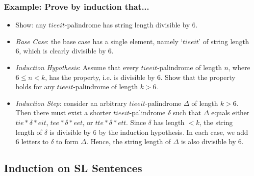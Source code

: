 \begin{frame}
\frametitle{Example: Prove by induction that...}

\begin{itemize}[<+->]

\item Show: any $tieeit$-palindrome has string length divisible by 6. 

\item[] \emph{Base Case}: the base case has a single element, namely `$tieeit$' of string length 6, which is clearly divisible by 6. 

\item[] \emph{Induction Hypothesis}: Assume that every $tieeit$-palindrome of length $n$, where $6 \leq n < k$, has the property, i.e. is divisible by 6. Show that the property holds for any $tieeit$-palindrome of length $k > 6$. 


\item[] \emph{Induction Step}: consider an arbitrary $tieeit$-palindrome $\Delta$ of length $k > 6$. Then there must exist a shorter $tieeit$-palindrome $\delta$ such that $\Delta$ equals either $tie*\delta*eit$, $tee*\delta*eet$, or $tte*\delta*ett$. Since $\delta$ has length $<k$, the string length of $\delta$ is divisible by 6 by the induction hypothesis. In each case, we add 6 letters to $\delta$ to form $\Delta$. Hence, the string length of $\Delta$ is also divisible by 6.


\end{itemize}
\end{frame}




\subsection{Induction on SL Sentences}

